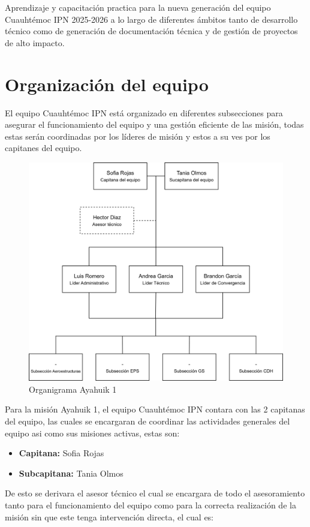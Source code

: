 \documentclass[letterpaper,12pt]{article} %
\begin{document}
    Aprendizaje y capacitación practica para la nueva generación del equipo Cuauhtémoc IPN 2025-2026 a lo largo de diferentes
    ámbitos tanto de desarrollo técnico como de generación de documentación técnica y de gestión de proyectos de alto impacto. 



\newpage

\section{Organización del equipo}

    El equipo Cuauhtémoc IPN está organizado en diferentes subsecciones para asegurar el funcionamiento del equipo y una gestión 
    eficiente de las misión, todas estas serán coordinadas por los líderes de misión 
    y estos a su ves por los capitanes del equipo. 
    \begin{figure}[!h]
      \centerline{\includegraphics[width=.5\textwidth]{ORG-AYA1-GM-V3.png}}
      \caption{Organigrama Ayahuik 1}
      \label{1}
    \end{figure}
    
    Para la misión Ayahuik 1, el equipo Cuauhtémoc IPN contara con las 2 capitanas del equipo, 
    las cuales se encargaran de coordinar las actividades generales del equipo asi como sus misiones activas, 
    estas son:

    \begin{itemize}
        \item \textbf{Capitana:} Sofia Rojas
        \item \textbf{Subcapitana:} Tania Olmos
    
    \end{itemize}

    De esto se derivara el asesor técnico el cual se encargara de todo el asesoramiento tanto para el funcionamiento del equipo
    como para la correcta realización de la misión sin que este tenga intervención directa, el cual es:
\end{document}
